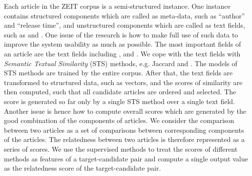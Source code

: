 Each article in the ZEIT corpus is a semi-structured instance. One instance contains structured components which are called as meta-data, such as ``author'' and ``release time'', and unstructured components which are called as text fields, such as \ititle{} and \icontent{}. One issue of the research is how to make full use of such data to improve the system usability as much as possible. The most important fields of an article are the text fields including \ititle{}, \isummary{} and \icontent{}. We cope with the text fields with \textit{Semantic Textual Similarity} (STS) methods, e.g. Jaccard and \tfidf{}. The models of STS methods are trained by the entire corpus. After that, the text fields are transformed to structured data, such as vectors, and the scores of similarity are then computed, such that all candidate articles are ordered and selected. The score is generated so far only by a single STS method over a single text field. Another issue is hence how to compute overall scores which are generated by the good combination of the components of articles. We consider the comparison between two articles as a set of comparisons between corresponding components of the articles. The relatedness between two articles is therefore represented as a series of scores. We use the supervised methods to treat the scores of different methods as features of a target-candidate pair and compute a single output value as the relatedness score of the target-candidate pair.

\clearpage

